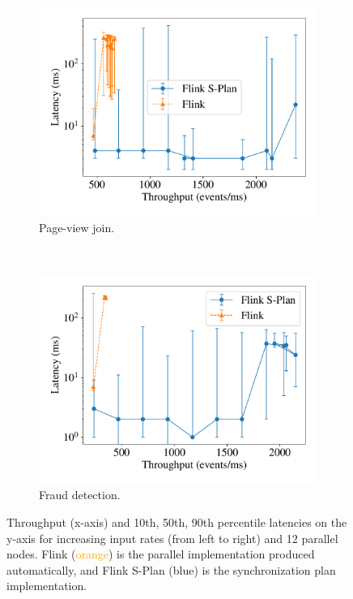 \begin{figure}[t]
    \centering
    \begin{subfigure}[b]{0.48\columnwidth}
      \centering
      \includegraphics[width=\textwidth]{figures/dgs/pageview-flink-splan.pdf}
      \caption{Page-view join.}
      \label{dgs:fig:synchronization-plan-page-view-join-throughput}
    \end{subfigure}
    ~
    \begin{subfigure}[b]{0.48\columnwidth}
      \centering
      \includegraphics[width=\textwidth]{figures/dgs/frauds-flink-splan.pdf}
      \caption{Fraud detection.}
      \label{dgs:fig:synchronization-plan-fraud-detection-throughput}
    \end{subfigure}
    \caption{
      Throughput (x-axis) and 10th, 50th, 90th percentile latencies on the y-axis for increasing input rates (from left to right) and 12 parallel nodes. Flink (\textcolor{Orange}{orange}) is the parallel implementation produced automatically, and Flink S-Plan (\textcolor{NavyBlue}{blue}) is the synchronization plan implementation.
      }
    \label{dgs:fig:synchronization-plan-throughputs-flink}
\end{figure}

